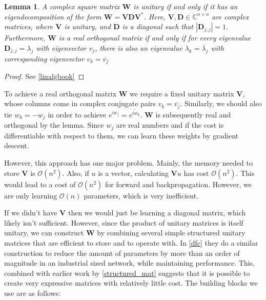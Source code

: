 \documentclass{article} %
\newcommand{\matr}[1]{\mathbf{#1}}
\newtheorem{lemma}{Lemma}
\begin{document}
\begin{lemma}
  A complex square matrix $\matr{W}$ is unitary if and only if it has an eigendecomposition of the form $\matr{W} = \matr{V} \matr{D} \matr{V}^*$. Here, $\matr{V}, \matr{D} \in \mathbb{C}^{n \times n}$ are complex matrices, where $\matr{V}$ is unitary, and $\matr{D}$ is a diagonal such that $|\matr{D}_{j,j}|=1$. Furthermore, $\matr{W}$ is a real orthogonal matrix if and only if for every eigenvalue $\matr{D}_{j,j} = \lambda_j$ with eigenvector $v_j$, there is also an eigenvalue $\lambda_k = \overline{\lambda_j}$ with corresponding eigenvector $v_k = \overline{v_j}$
\end{lemma}
\begin{proof}
  See \ref{linalgbook}
\end{proof}

To achieve a real orthogonal matrix $\matr{W}$ we require a fixed unitary matrix $\matr{V}$, whose columns come in complex conjugate pairs $v_k = \overline{v_j}$. Similarly, we should also tie $w_k=-w_j$ in order to achieve $e^{i w_j} = \overline{e^{i w_k}}$. $\matr{W}$ is subsequently real and orthogonal by the lemma. Since $w_j$ are real numbers and if the cost is differentiable with respect to them, we can learn these weights by gradient descent. 

However, this approach has one major problem. Mainly, the memory needed to store $\matr{V}$ is $\mathcal{O}\left(n^2\right)$. Also, if $u$ is a vector, calculating $\matr{V}u$ has cost $\mathcal{O}\left( n^2 \right)$. This would lead to a cost of $\mathcal{O} \left( n^2 \right)$ for forward and backpropagation. However, we are only learning $\mathcal{O}(n)$ parameters, which is very inefficient.

If we didn't have $\matr{V}$ then we would just be learning a diagonal matrix, which likely isn't sufficient. However, since the product of unitary matrices is itself unitary, we can construct $\matr{W}$ by combining several simple structured unitary matrices that are efficient to store and to operate with. In \ref{dfc} they do a similar construction to reduce the amount of parameters by more than an order of magnitude in an industrial sized network, while maintaining performance. This, combined with earlier work by \ref{structured_mat} suggests that it is possible to create very expressive matrices with relatively little cost. The building blocks we use are as follows:
\end{document}
